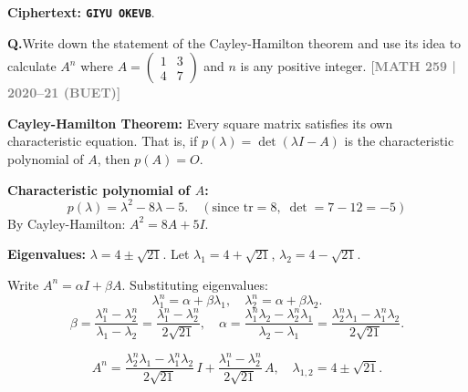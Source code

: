 \documentclass[12pt,a3paper]{article}
\newcommand{\yr}[1]{\hfill\textcolor{gray}{\small\textbf{[#1]}}}
\newcounter{qnum}
\newcommand{\Q}[1]{%
  \needspace{4\baselineskip}
  \refstepcounter{qnum}
  \vspace{6pt}
  \noindent\textbf{Q\theqnum.}\enspace #1\par
}
\begin{document}
\begin{tcolorbox}
\textbf{Ciphertext: \texttt{GIYU OKEVB}}.
 
\end{tcolorbox}
 
 

\Q{Write down the statement of the Cayley-Hamilton theorem and use its idea to calculate $A^n$ where $A = \begin{pmatrix} 1 & 3 \\ 4 & 7 \end{pmatrix}$ and $n$ is any positive integer.
\yr{MATH 259 | 2020--21 (BUET)}}

\begin{tcolorbox}[enhanced,breakable,
  colback=cA!4,colframe=cA,boxrule=0.8pt,arc=5pt,
  title={\textbf{Answer --- Cayley-Hamilton Theorem; $A^n$ for $A=\begin{pmatrix}1&3\\4&7\end{pmatrix}$}},
  fonttitle=\bfseries\color{white},colbacktitle=cA]
 
\textbf{Cayley-Hamilton Theorem:} Every square matrix satisfies its own characteristic equation. That is, if $p(\lambda)=\det(\lambda I-A)$ is the characteristic polynomial of $A$, then $p(A)=O$.
 
\medskip
\textbf{Characteristic polynomial of $A$:}
\[
p(\lambda) = \lambda^2 - 8\lambda - 5. \quad (\text{since }\mathrm{tr}=8,\;\det=7-12=-5)
\]
By Cayley-Hamilton: $A^2 = 8A + 5I$.
 
\textbf{Eigenvalues:} $\lambda = 4\pm\sqrt{21}$. Let $\lambda_1=4+\sqrt{21}$, $\lambda_2=4-\sqrt{21}$.
 
Write $A^n = \alpha I + \beta A$. Substituting eigenvalues:
\[
\lambda_1^n = \alpha + \beta\lambda_1,\quad \lambda_2^n = \alpha + \beta\lambda_2.
\]
\[
\beta = \frac{\lambda_1^n - \lambda_2^n}{\lambda_1 - \lambda_2} = \frac{\lambda_1^n - \lambda_2^n}{2\sqrt{21}},\quad
\alpha = \frac{\lambda_1^n\lambda_2 - \lambda_2^n\lambda_1}{\lambda_2 - \lambda_1} = \frac{\lambda_2^n\lambda_1 - \lambda_1^n\lambda_2}{2\sqrt{21}}.
\]
 
\[
\boxed{A^n = \frac{\lambda_2^n\lambda_1-\lambda_1^n\lambda_2}{2\sqrt{21}}\,I + \frac{\lambda_1^n-\lambda_2^n}{2\sqrt{21}}\,A,\quad\lambda_{1,2}=4\pm\sqrt{21}.}
\]
 
\end{tcolorbox}
 
\end{document}
